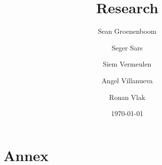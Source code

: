 \documentclass{article} %
\title{Research} %
\author{Sean Groenenboom \and Seger Sars \and Siem Vermeulen \and Angel Villanueva \and Ronan Vlak} %
\date{\today} %
\begin{document}
\maketitle %
\newpage

\tableofcontents %
\newpage













\section{Annex}
\printbibliography
\end{document}
